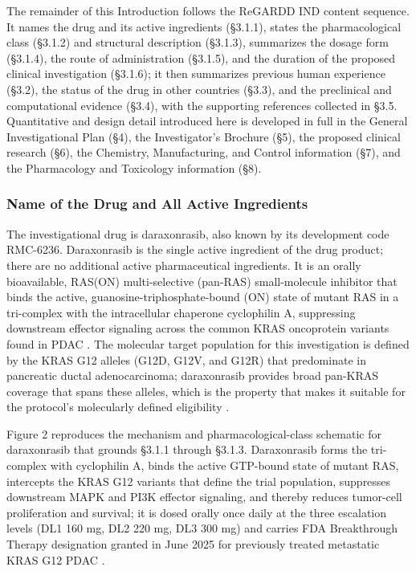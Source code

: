 The remainder of this Introduction follows the ReGARDD IND content sequence. It
names the drug and its active ingredients (\S 3.1.1), states the pharmacological
class (\S 3.1.2) and structural description (\S 3.1.3), summarizes the dosage form
(\S 3.1.4), the route of administration (\S 3.1.5), and the duration of the
proposed clinical investigation (\S 3.1.6); it then summarizes previous human
experience (\S 3.2), the status of the drug in other countries (\S 3.3), and the
preclinical and computational evidence (\S 3.4), with the supporting references
collected in \S 3.5. Quantitative and design detail introduced here is developed
in full in the General Investigational Plan (\S 4), the Investigator's Brochure
(\S 5), the proposed clinical research (\S 6), the Chemistry, Manufacturing, and
Control information (\S 7), and the Pharmacology and Toxicology information (\S 8).

\subsubsection{Name of the Drug and All Active Ingredients}

The investigational drug is daraxonrasib, also known by its development code
RMC-6236. Daraxonrasib is the single active ingredient of the drug product; there
are no additional active pharmaceutical ingredients. It is an orally bioavailable,
RAS(ON) multi-selective (pan-RAS) small-molecule inhibitor that binds the active,
guanosine-triphosphate-bound (ON) state of mutant RAS in a tri-complex with the
intracellular chaperone cyclophilin A, suppressing downstream effector signaling
across the common KRAS oncoprotein variants found in PDAC \cite{daraxwhipple,
onpremwhippl}. The molecular target population for this investigation is defined by
the KRAS G12 alleles (G12D, G12V, and G12R) that predominate in pancreatic ductal
adenocarcinoma; daraxonrasib provides broad pan-KRAS coverage that spans these
alleles, which is the property that makes it suitable for the protocol's
molecularly defined eligibility \cite{daraxwhipple}.

Figure 2 reproduces the mechanism and pharmacological-class schematic for
daraxonrasib that grounds \S 3.1.1 through \S 3.1.3. Daraxonrasib forms the
tri-complex with cyclophilin A, binds the active GTP-bound state of mutant RAS,
intercepts the KRAS G12 variants that define the trial population, suppresses
downstream MAPK and PI3K effector signaling, and thereby reduces tumor-cell
proliferation and survival; it is dosed orally once daily at the three escalation
levels (DL1 160 mg, DL2 220 mg, DL3 300 mg) and carries FDA Breakthrough Therapy
designation granted in June 2025 for previously treated metastatic KRAS G12 PDAC
\cite{daraxwhipple, onpremwhippl}.

